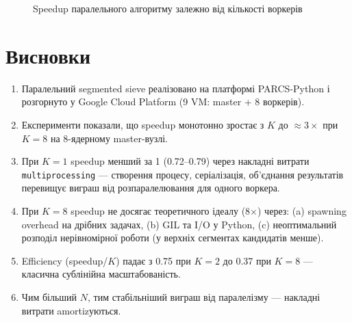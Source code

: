\documentclass[12pt,a4paper]{article}
\begin{document}
\begin{figure}[h]
\centering
{}
\caption{Speedup паралельного алгоритму залежно від кількості воркерів}
\end{figure}

\section{Висновки}

\begin{enumerate}
    \item Паралельний segmented sieve реалізовано на платформі PARCS-Python і розгорнуто у Google Cloud Platform (9 VM: master + 8 воркерів).
    \item Експерименти показали, що speedup монотонно зростає з $K$ до $\approx 3\times$ при $K=8$ на 8-ядерному master-вузлі.
    \item При $K=1$ speedup менший за 1 (0.72--0.79) через накладні витрати \texttt{multiprocessing} — створення процесу, серіалізація, об'єднання результатів перевищує виграш від розпаралелювання для одного воркера.
    \item При $K=8$ speedup не досягає теоретичного ідеалу (8$\times$) через: (a) spawning overhead на дрібних задачах, (b) GIL та I/O у Python, (c) неоптимальний розподіл нерівномірної роботи (у верхніх сегментах кандидатів менше).
    \item Efficiency (speedup/$K$) падає з 0.75 при $K=2$ до 0.37 при $K=8$ — класична сублінійна масштабованість.
    \item Чим більший $N$, тим стабільніший виграш від паралелізму — накладні витрати amortizуються.
\end{enumerate}
\end{document}
